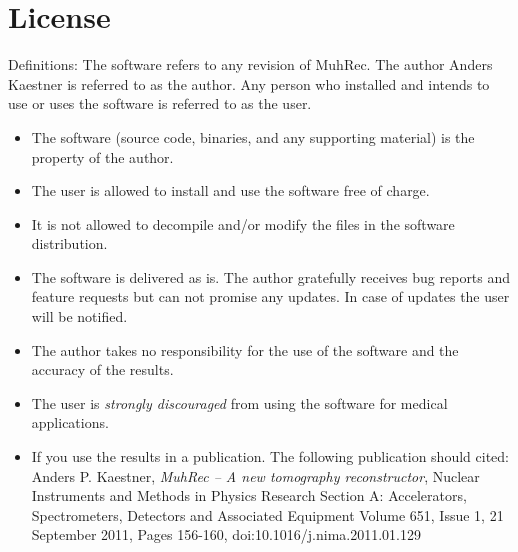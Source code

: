 \documentclass[a4paper]{scrreprt}
\begin{document}
\chapter{License}
Definitions: The software refers to any revision of MuhRec. The author Anders
Kaestner is referred to as the author. Any person who installed and intends to
use or uses the software is referred to as the user.
\begin{itemize}
\item The software (source code, binaries, and any supporting material) is the property of the author.
\item The user is allowed to install and use the software free of charge.
\item It is not allowed to decompile and/or modify the files in the software distribution.
\item The software is delivered as is. The author gratefully receives bug
reports and feature requests but can not promise any updates. In case of updates
the user will be notified.
\item The author takes no responsibility for the use of the software and the
accuracy of the results.
\item The user is \emph{strongly discouraged} from using the software for
medical applications.
\item If you use the results in a publication. The following publication should
cited: Anders P. Kaestner, \emph{MuhRec -- A new tomography reconstructor},
Nuclear Instruments and Methods in Physics Research Section A:
Accelerators, Spectrometers, Detectors and Associated Equipment
Volume 651, Issue 1, 21 September 2011, Pages 156-160,
doi:10.1016/j.nima.2011.01.129

\end{itemize}
\end{document}
